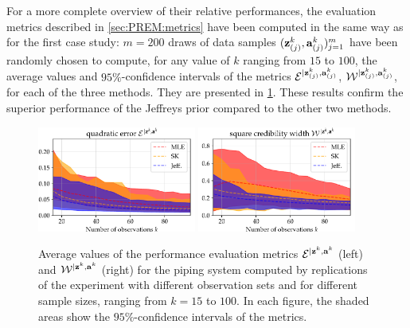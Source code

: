 For a more complete overview of their relative performances, the evaluation metrics described in \cref{sec:PREM:metrics}  have been computed in the same way as for the first case study: $m=200$ draws of data samples $(\mathbf{z}^k_{(j)},\mathbf{a}^k_{(j)})_{j=1}^m$ have been randomly chosen to compute, for any value of $k$ ranging from $15$ to $100$, the average values and $95\%$-confidence intervals of the metrics $\mathcal{E}^{|\mathbf{z}^k_{(j)},\mathbf{a}^k_{(j)}}$, $\mathcal{W}^{|\mathbf{z}^k_{(j)},\mathbf{a}^k_{(j)}}$, for each of the three methods. They are presented in \cref{fig:ASG-errors}. These results confirm the superior performance of the Jeffreys prior compared to the other two methods.    





\begin{figure}[h!]
    \centering%
    \includegraphics[width=5.2cm]{figures/PREM/asg/errE.pdf}\hspace*{0.5cm}
    \includegraphics[width=5.2cm]{figures/PREM/asg/errW.pdf}
    \caption{%
    Average values of the performance evaluation metrics $\mathcal{E}^{|\mathbf{z}^k,\mathbf{a}^k}$ (left) and $\mathcal{W}^{|\mathbf{z}^k,\mathbf{a}^k}$ (right) for the piping system computed by replications of the experiment with different observation sets and for different sample sizes, ranging from $k=15$ to $100$. In each figure, the shaded areas show the $95\%$-confidence intervals of the metrics.}
    \label{fig:ASG-errors}
\end{figure}


